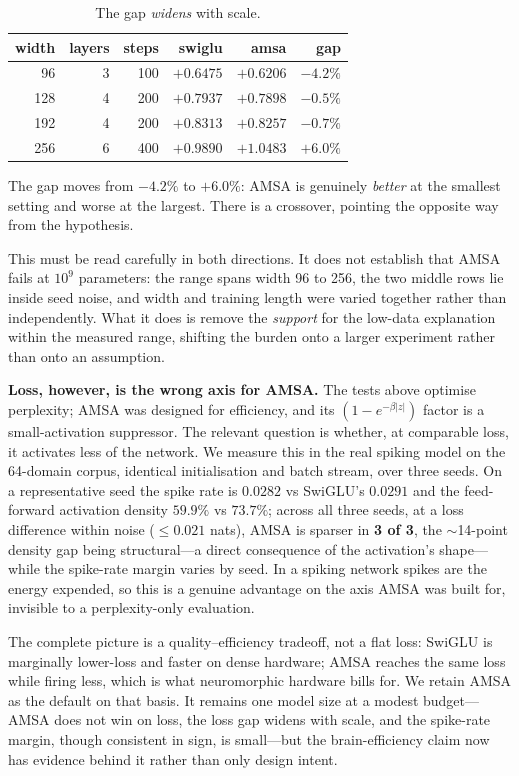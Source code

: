 \documentclass[10pt,twocolumn]{article}
\begin{document}
\begin{table}[h]
\centering\small
\begin{tabular}{@{}rrrrrr@{}}
\toprule
width & layers & steps & swiglu & amsa & gap \\
\midrule
96 & 3 & 100 & $+0.6475$ & $\mathbf{+0.6206}$ & $-4.2\%$ \\
128 & 4 & 200 & $+0.7937$ & $+0.7898$ & $-0.5\%$ \\
192 & 4 & 200 & $+0.8313$ & $+0.8257$ & $-0.7\%$ \\
256 & 6 & 400 & $\mathbf{+0.9890}$ & $+1.0483$ & $+6.0\%$ \\
\bottomrule
\end{tabular}
\caption{The gap \emph{widens} with scale.}
\end{table}

The gap moves from $-4.2\%$ to $+6.0\%$: AMSA is genuinely \emph{better} at the
smallest setting and worse at the largest. There is a crossover, pointing the
opposite way from the hypothesis.

This must be read carefully in both directions. It does not establish that AMSA
fails at $10^9$ parameters: the range spans width 96 to 256, the two middle rows
lie inside seed noise, and width and training length were varied together rather
than independently. What it does is remove the \emph{support} for the low-data
explanation within the measured range, shifting the burden onto a larger
experiment rather than onto an assumption.

\textbf{Loss, however, is the wrong axis for AMSA.} The tests above optimise
perplexity; AMSA was designed for efficiency, and its $(1 - e^{-\beta|z|})$
factor is a small-activation suppressor. The relevant question is whether, at
comparable loss, it activates less of the network. We measure this in the real
spiking model on the 64-domain corpus, identical initialisation and batch stream,
over three seeds. On a representative seed the spike rate is $0.0282$ vs SwiGLU's
$0.0291$ and the feed-forward activation density $59.9\%$ vs $73.7\%$; across all
three seeds, at a loss difference within noise ($\leq 0.021$ nats), AMSA is
sparser in \textbf{3 of 3}, the $\sim$14-point density gap being structural---a
direct consequence of the activation's shape---while the spike-rate margin varies
by seed. In a spiking network spikes are the energy expended, so this is a
genuine advantage on the axis AMSA was built for, invisible to a
perplexity-only evaluation.

The complete picture is a quality--efficiency tradeoff, not a flat loss: SwiGLU
is marginally lower-loss and faster on dense hardware; AMSA reaches the same loss
while firing less, which is what neuromorphic hardware bills for. We retain AMSA
as the default on that basis. It remains one model size at a modest budget---AMSA
does not win on loss, the loss gap widens with scale, and the spike-rate margin,
though consistent in sign, is small---but the brain-efficiency claim now has
evidence behind it rather than only design intent.
\end{document}
